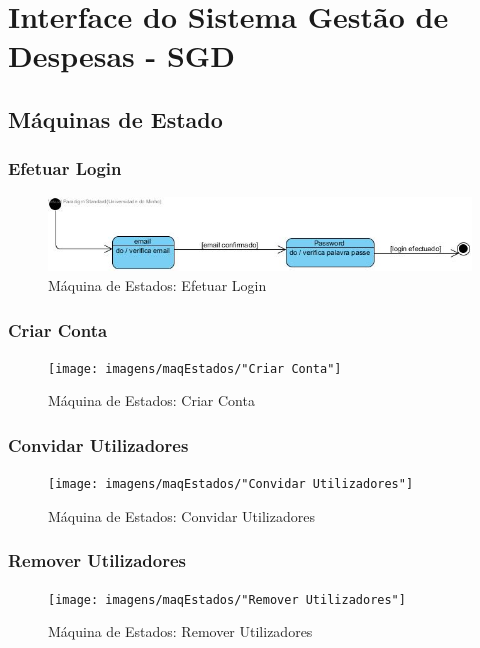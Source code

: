 \chapter{Interface do Sistema Gestão de Despesas - SGD}
\section{Máquinas de Estado}
\subsection{Efetuar Login}

\begin{figure}[htb!]
	\centering
	\includegraphics[scale=0.7]{imagens/maqEstados/Login}  
	\caption{Máquina de Estados: Efetuar Login}  
\end{figure}


\subsection{Criar Conta}
\begin{figure}[htb!]
	\centering
	\texttt{[image: imagens/maqEstados/"Criar Conta"]}  
	\caption{Máquina de Estados: Criar Conta}  
\end{figure}

\newpage

\subsection{Convidar Utilizadores}
\begin{figure}[htb!]
	\centering
	\texttt{[image: imagens/maqEstados/"Convidar Utilizadores"]}  
	\caption{Máquina de Estados: Convidar Utilizadores}  
\end{figure}

\subsection{Remover Utilizadores}
\begin{figure}[htb!]
	\centering
	\texttt{[image: imagens/maqEstados/"Remover Utilizadores"]}  
	\caption{Máquina de Estados: Remover Utilizadores}  
\end{figure}

